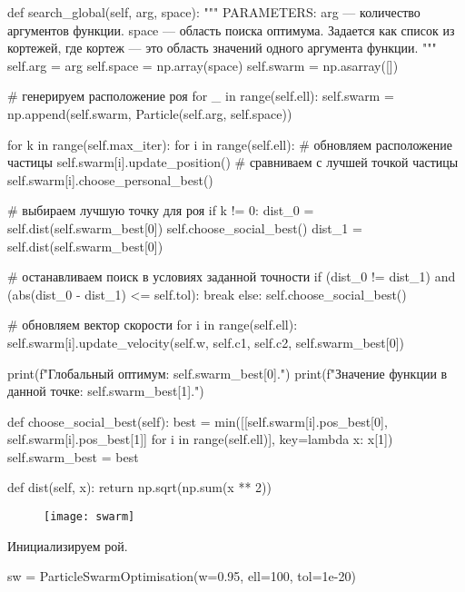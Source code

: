 \newpage
\begin{pyprint}
  def search_global(self, arg, space):
    """
    PARAMETERS:
    arg --- количество аргументов функции.
    space --- область поиска оптимума. Задается как список из кортежей,
    где кортеж --- это область значений одного аргумента функции.
    """
    self.arg = arg
    self.space = np.array(space)
    self.swarm = np.asarray([])

    # генерируем расположение роя
    for _ in range(self.ell):
       self.swarm = np.append(self.swarm,
                              Particle(self.arg, self.space))

    for k in range(self.max_iter):
       for i in range(self.ell):
          # обновляем расположение частицы
          self.swarm[i].update_position()
          # сравниваем с лучшей точкой частицы
          self.swarm[i].choose_personal_best()

       # выбираем лучшую точку для роя
       if k != 0:
          dist_0 = self.dist(self.swarm_best[0])
          self.choose_social_best()
          dist_1 = self.dist(self.swarm_best[0])

          # останавливаем поиск в условиях заданной точности
          if (dist_0 != dist_1) and (abs(dist_0 - dist_1) <= self.tol):
             break
       else:
          self.choose_social_best()

       # обновляем вектор скорости
       for i in range(self.ell):
          self.swarm[i].update_velocity(self.w, self.c1,
                                        self.c2, self.swarm_best[0])

       print(f"Глобальный оптимум: {self.swarm_best[0]}.")
       print(f"Значение функции в данной точке: {self.swarm_best[1]}.")

  def choose_social_best(self):
    best = min([[self.swarm[i].pos_best[0],
                 self.swarm[i].pos_best[1]] for i in range(self.ell)],
                 key=lambda x: x[1])
    self.swarm_best = best

  def dist(self, x):
    return np.sqrt(np.sum(x ** 2))
\end{pyprint}


\begin{figure}[h!]
\centering
\texttt{[image: swarm]}
\label{img:swarm}
\end{figure}

Инициализируем рой.
\begin{pyin}
sw = ParticleSwarmOptimisation(w=0.95, ell=100, tol=1e-20)
\end{pyin}

